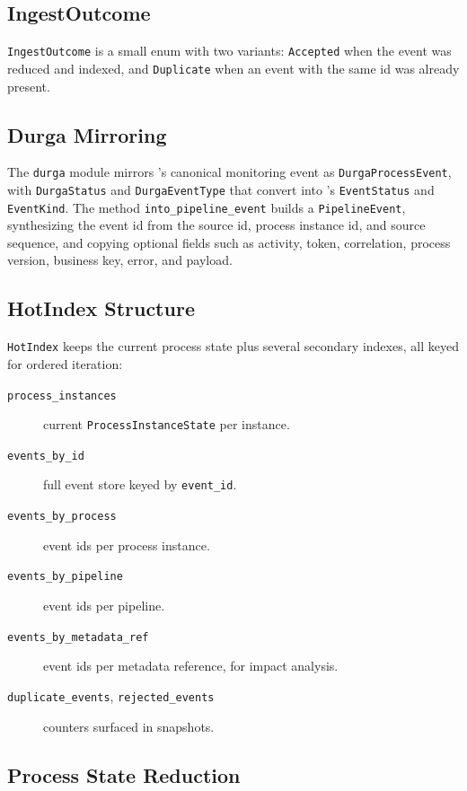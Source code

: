 \subsection{IngestOutcome}

\texttt{IngestOutcome} is a small enum with two variants: \texttt{Accepted} when
the event was reduced and indexed, and \texttt{Duplicate} when an event with the
same id was already present.

\subsection{Durga Mirroring}

The \texttt{durga} module mirrors \durga{}'s canonical monitoring event as
\texttt{DurgaProcessEvent}, with \texttt{DurgaStatus} and \texttt{DurgaEventType}
that convert into \vannak{}'s \texttt{EventStatus} and \texttt{EventKind}. The
method \texttt{into\_pipeline\_event} builds a \texttt{PipelineEvent},
synthesizing the event id from the source id, process instance id, and source
sequence, and copying optional fields such as activity, token, correlation,
process version, business key, error, and payload.

\subsection{HotIndex Structure}

\texttt{HotIndex} keeps the current process state plus several secondary
indexes, all keyed for ordered iteration:

\begin{description}
\item[\texttt{process\_instances}] current \texttt{ProcessInstanceState} per
  instance.
\item[\texttt{events\_by\_id}] full event store keyed by \texttt{event\_id}.
\item[\texttt{events\_by\_process}] event ids per process instance.
\item[\texttt{events\_by\_pipeline}] event ids per pipeline.
\item[\texttt{events\_by\_metadata\_ref}] event ids per metadata reference, for
  impact analysis.
\item[\texttt{duplicate\_events}, \texttt{rejected\_events}] counters surfaced
  in snapshots.
\end{description}

\subsection{Process State Reduction}


